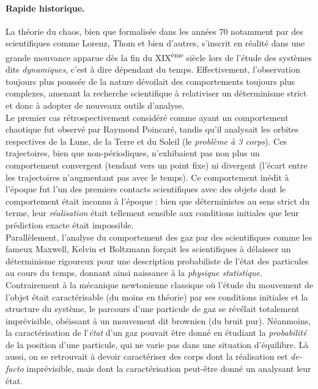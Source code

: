 \documentclass[12pt,a4paper]{article}
\begin{document}
\paragraph{Rapide historique.} La théorie du chaos, bien que formalisée dans les années 70 notamment par des scientifiques comme Lorenz, Thom et bien d'autres, s'inscrit en réalité dans une grande mouvance apparue dès la fin du XIX\textsuperscript{ème} siècle lors de l'étude des systèmes dits \textit{dynamiques}, c'est à dire dépendant du temps. Effectivement, l'observation toujours plus poussée de la nature dévoilait des comportements toujours plus complexes, amenant la recherche scientifique à relativiser un déterminisme strict et donc à adopter de nouveaux outils d'analyse. \\

Le premier cas rétrospectivement considéré comme ayant un comportement chaotique fut observé par Raymond Poincaré, tandis qu'il analysait les orbites respectives de la Lune, de la Terre et du Soleil (le \textit{problème à 3 corps}). Ces trajectoires, bien que non-périodiques, n'exhibaient pas non plus un comportement convergent (tendant vers un point fixe) ni divergent (l'écart entre les trajectoires n'augmentant pas avec le temps). Ce comportement inédit à l'époque fut l'un des premiers contacts scientifiques avec des objets dont le comportement était inconnu à l'époque : bien que déterministes au sens strict du terme, leur \textit{réalisation} était tellement sensible aux conditions initiales que leur prédiction exacte était impossible. \\
 Parallèlement, l'analyse du comportement des gaz par des scientifiques comme les fameux Maxwell, Kelvin et Boltzmann forçait les scientifiques à délaisser un déterminisme rigoureux pour une description probabiliste de l'état des particules au cours du temps, donnant ainsi naissance à la \textit{physique statistique}. Contrairement à la mécanique newtonienne classique où l'étude du mouvement de l'objet était caractérisable (du moins en théorie) par ses conditions initiales et la structure du système, le parcours d'une particule de gaz se révélait totalement imprévisible, obéissant à un mouvement dit brownien (du bruit pur). Néanmoins, la caractérisation de l'\textit{état} d'un gaz pouvait être donné en étudiant la \textit{probabilité} de la position d'une particule, qui ne varie pas dans une situation d'équilibre. Là aussi, on se retrouvait à devoir caractériser des corps dont la réalisation est \textit{de-facto} imprévisible, mais dont la caractérisation peut-être donné un analysant leur état. \\
 
\end{document}
